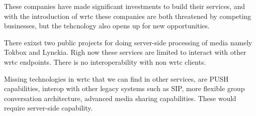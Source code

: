 These companies have made significant investments to build their services, and with the introduction of \gls{wrtc} these companies are both threatened by competing businesses, but the tehcnology also opens up for new opportunities.

There exixst two public projects for doing server-side processing of media namely Tokbox and Lynckia. Righ now these services are limited to interact with other \gls{wrtc} endpoints. There is no interoperability with non \gls{wrtc} clients.

Missing technologies in \gls{wrtc} that we can find in other services, are PUSH capabilities, interop with other legacy systems such as SIP, more flexible group conversation architecture, advanced media sharing capabilities. These would require server-side capability.